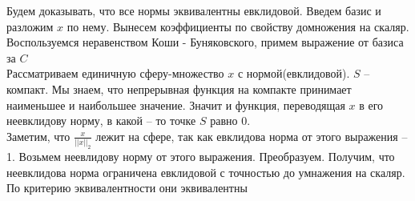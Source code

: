 	Будем доказывать, что все нормы эквивалентны евклидовой. Введем базис и разложим $x$ по нему. Вынесем коэффициенты по свойству домножения на скаляр. Воспользуемся неравенством Коши - Буняковского, примем выражение от базиса за $C$\\
	Рассматриваем единичную сферу-множество $x$ с нормой(евклидовой). $S$ -- компакт. Мы знаем, что непрерывная функция на компакте принимает наименьшее и наибольшее значение. Значит и функция, переводящая $x$ в его неевклидову норму, в какой -- то точке $S$ равно 0.\\
	Заметим, что $\frac{x}{||x||_2}$ лежит на сфере, так как евклидова норма от этого выражения -- 1. Возьмем неевлидову норму от этого выражения. Преобразуем. Получим, что неевклидова норма ограничена евклидовой с точностью до умнажения на скаляр. По критерию эквивалентности они эквивалентны 

\newpage
